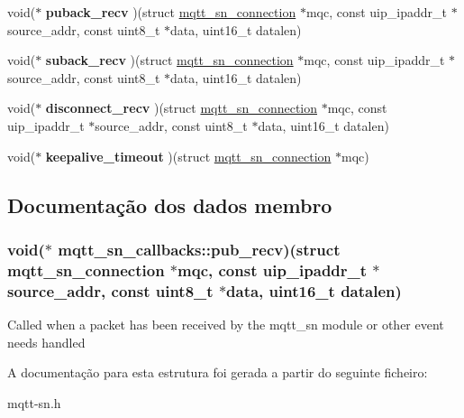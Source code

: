 \begin{DoxyCompactItemize}
\item 
\hypertarget{structmqtt__sn__callbacks_a3b3d41b5c5b297dd28fd9114f6686e70}{void($\ast$ {\bfseries puback\+\_\+recv} )(struct \hyperlink{structmqtt__sn__connection}{mqtt\+\_\+sn\+\_\+connection} $\ast$mqc, const uip\+\_\+ipaddr\+\_\+t $\ast$source\+\_\+addr, const uint8\+\_\+t $\ast$data, uint16\+\_\+t datalen)}\label{structmqtt__sn__callbacks_a3b3d41b5c5b297dd28fd9114f6686e70}

\item 
\hypertarget{structmqtt__sn__callbacks_aed4da3de327394445e6742a76e5cbbc1}{void($\ast$ {\bfseries suback\+\_\+recv} )(struct \hyperlink{structmqtt__sn__connection}{mqtt\+\_\+sn\+\_\+connection} $\ast$mqc, const uip\+\_\+ipaddr\+\_\+t $\ast$source\+\_\+addr, const uint8\+\_\+t $\ast$data, uint16\+\_\+t datalen)}\label{structmqtt__sn__callbacks_aed4da3de327394445e6742a76e5cbbc1}

\item 
\hypertarget{structmqtt__sn__callbacks_af2efc842c2e60d863599ad77fa767a42}{void($\ast$ {\bfseries disconnect\+\_\+recv} )(struct \hyperlink{structmqtt__sn__connection}{mqtt\+\_\+sn\+\_\+connection} $\ast$mqc, const uip\+\_\+ipaddr\+\_\+t $\ast$source\+\_\+addr, const uint8\+\_\+t $\ast$data, uint16\+\_\+t datalen)}\label{structmqtt__sn__callbacks_af2efc842c2e60d863599ad77fa767a42}

\item 
\hypertarget{structmqtt__sn__callbacks_a5e55df3d3f6ef76593045024d945130f}{void($\ast$ {\bfseries keepalive\+\_\+timeout} )(struct \hyperlink{structmqtt__sn__connection}{mqtt\+\_\+sn\+\_\+connection} $\ast$mqc)}\label{structmqtt__sn__callbacks_a5e55df3d3f6ef76593045024d945130f}

\end{DoxyCompactItemize}


\subsection{Documentação dos dados membro}
\hypertarget{structmqtt__sn__callbacks_abb5a49835c717825b5578762401e13c6}{
\subsubsection[{pub\+\_\+recv}]{\setlength{\rightskip}{0pt plus 5cm}void($\ast$  mqtt\+\_\+sn\+\_\+callbacks\+::pub\+\_\+recv)(struct {\bf mqtt\+\_\+sn\+\_\+connection} $\ast$mqc, const uip\+\_\+ipaddr\+\_\+t $\ast$source\+\_\+addr, const uint8\+\_\+t $\ast$data, uint16\+\_\+t datalen)}}\label{structmqtt__sn__callbacks_abb5a49835c717825b5578762401e13c6}
Called when a packet has been received by the mqtt\+\_\+sn module or other event needs handled 

A documentação para esta estrutura foi gerada a partir do seguinte ficheiro\+:\begin{DoxyCompactItemize}
\item 
mqtt-\/sn.\+h\end{DoxyCompactItemize}

